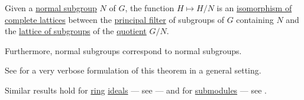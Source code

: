 \begin{theorem}\label{thm:lattice_theorem_for_subgroups}
  Given a \hyperref[def:normal_subgroup]{normal subgroup} \( N \) of \( G \), the function \( H \mapsto H / N \) is an \hyperref[def:lattice/homomorphism]{isomorphism of complete lattices} between the \hyperref[def:lattice_ideal/principal]{principal filter} of subgroups of \( G \) containing \( N \) and the \hyperref[thm:substructures_form_complete_lattice]{lattice of subgroups} of the \hyperref[def:group/quotient]{quotient} \( G / N \).

  Furthermore, normal subgroups correspond to normal subgroups.
\end{theorem}
\begin{comments}
  \item See  for a very verbose formulation of this theorem in a general setting.
  \item Similar results hold for \hyperref[def:ring]{ring} \hyperref[def:semiring_ideal]{ideals} --- see  --- and for \hyperref[def:module/submodel]{submodules} --- see .
\end{comments}
